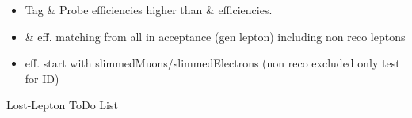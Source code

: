 \documentclass{beamer}
\begin{document}
\begin{frame}
\begin{columns}
\begin{column}{0.33\textwidth}
   \end{column}
  \end{columns}
\begin{itemize}
 \item Tag \& Probe efficiencies higher than \ttbar \& \wpj efficiencies.
 \item \ttbar \& \wpj eff. matching from all in acceptance (gen lepton) including non reco leptons
 \item \Zll eff. start with slimmedMuons/slimmedElectrons (non reco excluded only test for ID)
\end{itemize}

\end{frame}


\begin{frame}
 \begin{block}{}
 \centering
 \Large Lost-Lepton ToDo List
 \end{block}


\end{frame}
\end{document}
